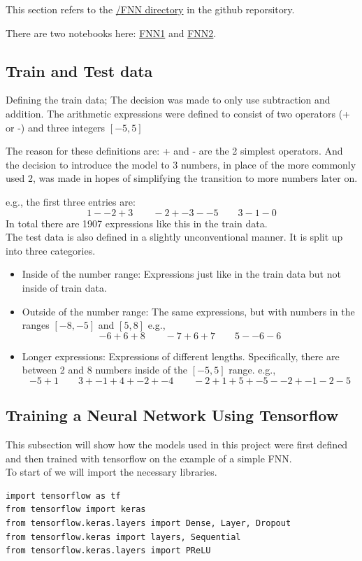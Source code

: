 \documentclass{article}
\begin{document}
This section refers to the \href{https://github.com/AntonStantan/matura/tree/main/FNN}
{/FNN directory} in the github reporsitory.

There are two notebooks here: \href{https://github.com/AntonStantan/matura/blob/main/FNN/FNN1.ipynb}
{FNN1} and \href{https://github.com/AntonStantan/matura/blob/main/FNN/FNN2.ipynb}
{FNN2}.

\subsection{Train and Test data}
Defining the train data; The decision was made to only use subtraction and 
addition. The arithmetic expressions were defined to consist of two 
operators (+ or -) and three integers $[-5, 5]$

The reason for these definitions are: + and - are the 2 simplest operators. 
And the decision to introduce the model to 3 numbers, in place of the more 
commonly used 2, was made in hopes of simplifying the transition to more 
numbers later on.

e.g., the first three entries are: 
\[
1 - -2 + 3 \qquad -2 + -3 - -5 \qquad 3 - 1 - 0
\]
{\small In total there are 1907 expressions like this in the train data.}
\\[2em]
The test data is also defined in a slightly unconventional manner. It is 
split up into three categories.
\begin{itemize}
    \item Inside of the number range: Expressions just like in the train 
data but not inside of train data. 
    \item Outside of the number range: The same expressions, but with 
numbers in the ranges $[-8, -5]$ and $[5, 8]$ e.g.,
\[
-6 + 6 + 8 \qquad -7 + 6 + 7 \qquad 5 - -6 - 6
\]
    \item Longer expressions: Expressions of different lengths. 
Specifically, there are between 2 and 8 numbers inside of the $[-5, 5]$ 
range. e.g.,
\[
-5 + 1 \qquad 3 + -1 + 4 + -2 + -4 \qquad -2 + 1 + 5 + -5 - -2 + -1 - 2 - 5
\]
\end{itemize}

\subsection{Training a Neural Network Using Tensorflow}
This subsection will show how the models used in this project were first 
defined and then trained with tensorflow on the example of a simple FNN.
\\[2em]
To start of we will import the necessary libraries.
\begin{Verbatim}
import tensorflow as tf
from tensorflow import keras
from tensorflow.keras.layers import Dense, Layer, Dropout
from tensorflow.keras import layers, Sequential
from tensorflow.keras.layers import PReLU
\end{Verbatim}
\end{document}
